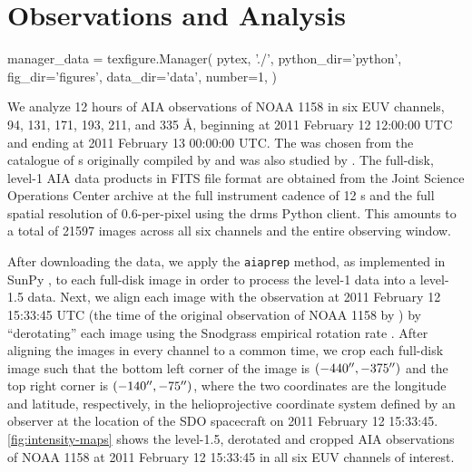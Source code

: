 \section{Observations and Analysis}\label{sec:observations}

\begin{pycode}
manager_data = texfigure.Manager(
    pytex, './',
    python_dir='python',
    fig_dir='figures',
    data_dir='data',
    number=1,
)
\end{pycode}

We analyze 12 hours of AIA observations of \AR{} NOAA 1158 in six EUV channels, 94, 131, 171, 193, 211, and 335 \AA{}, beginning at 2011 February 12 12:00:00 UTC and ending at 2011 February 13 00:00:00 UTC. The \AR{} was chosen from the catalogue of \AR s originally compiled by \citet{warren_systematic_2012} and was also studied by \citet{viall_survey_2017}. The full-disk, level-1 AIA data products in FITS file format are obtained from the Joint Science Operations Center \citep[JSOC,][]{couvidat_observables_2016} archive at the full instrument cadence of 12 s and the full spatial resolution of 0.6\arcsec-per-pixel using the drms Python client. This amounts to a total of 21597 images across all six channels and the entire observing window.

After downloading the data, we apply the \texttt{aiaprep} method, as implemented in SunPy \citep{sunpy_community_sunpypython_2015}, to each full-disk image in order to process the level-1 data into a level-1.5 data. Next, we align each image with the observation at 2011 February 12 15:33:45 UTC (the time of the original observation of NOAA 1158 by \citet{warren_systematic_2012}) by ``derotating'' each image using the Snodgrass empirical rotation rate \citep{snodgrass_magnetic_1983}. After aligning the images in every channel to a common time, we crop each full-disk image such that the bottom left corner of the image is $(-440\mbox{$^{\prime\prime}$},-375\mbox{$^{\prime\prime}$})$ and the top right corner is $(-140\mbox{$^{\prime\prime}$},-75\mbox{$^{\prime\prime}$})$, where the two coordinates are the longitude and latitude, respectively, in the helioprojective coordinate system \citep[see][]{thompson_coordinate_2006} defined by an observer at the location of the SDO spacecraft on 2011 February 12 15:33:45. \autoref{fig:intensity-maps} shows the level-1.5, derotated and cropped AIA observations of \AR{} NOAA 1158 at 2011 February 12 15:33:45 in all six EUV channels of interest.

